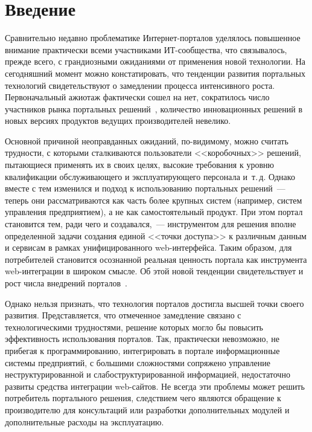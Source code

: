 \begin{multicols}{2}


\label{st\stat}

\section{Введение}

Сравнительно недавно проблематике Интер\-нет-порталов уделялось повышенное
внимание практически всеми участниками ИТ-сообщества, что связывалось, прежде всего,
с грандиозными ожиданиями от применения новой технологии. На сегодняшний момент
можно констатировать, что тенденции развития портальных технологий свидетельствуют
о замедлении процесса интенсивного роста. Первоначальный ажиотаж фактически сошел
на нет, сократилось число участников рынка портальных решений~\cite{1bos}, количество
инновационных решений в новых версиях продуктов ведущих производителей невелико.

 Основной причиной неоправданных ожиданий, по-видимому, можно считать
трудности, с которыми сталкиваются пользователи <<коробочных>> решений,
пытающиеся применять их в своих целях, высокие требования к уровню квалификации
обслуживающего и эксплуатирующего персонала и~т.\,д. Однако вместе с тем изменился
и подход к использованию портальных решений~--- теперь они рассматриваются как
часть более крупных систем (например, систем управления предприятием), а не как
самостоятельный продукт. При этом портал становится тем, ради чего и создавался,~---
инструментом для решения вполне определенной задачи создания единой <<точки
доступа>> к различным данным и сервисам в рамках унифицированного web-интерфейса.
Таким образом, для потребителей становится осознанной реальная ценность портала как
инструмента web-интеграции в широком смыс\-ле. Об этой новой тенденции
свидетельствует и рост числа внедрений порталов~\cite{2bos}.

 Однако нельзя признать, что технология порталов достигла высшей точки своего
развития. Представляется, что отмеченное замедление связано с технологическими
трудностями, решение которых могло бы повысить эффективность использования
порталов. Так, практически невозможно, не прибегая к программированию, интегрировать
в портале информационные системы предприятий, с большими сложностями сопряжено
управление неструктурированной и слабоструктурированной информацией, недостаточно
развиты средства интеграции web-сайтов. Не всегда эти проблемы может решить
потребитель портального решения, следствием чего являются обращение к
производителю для консультаций или разработки дополнительных модулей и
дополнительные расходы на эксплуатацию.


\end{multicols}
